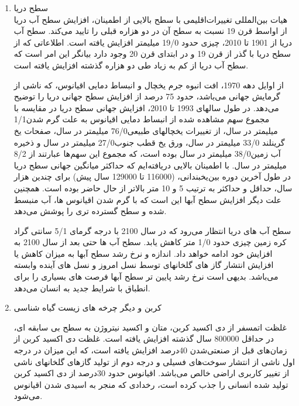 \begin{enumerate}
		
		
		
		
		
		
		\item  سطح دریا\\
		هیات بین‌المللی تغییرات‌اقلیمی با سطح بالایی از اطمینان، افزایش سطح آب دریا از اواسط قرن 19 نسبت به سطح آن در دو هزاره قبلی را تایید می‌کند. سطح آب دریا از 1901 تا 2010، چیزی حدود 19/0 میلیمتر افزایش یافته است. اطلاعاتی که از سطح دریا با گذر از قرن 19 و در ابتدای قرن 20 وجود دارد بیانگر این امر است که سطح آب دریا از کم به زیاد طی دو هزاره گذشته افزایش یافته است. 
		
		از اوایل دهه 1970، افت انبوه جرم یخچال و انبساط دمایی اقیانوس، که ناشی از گرمایش جهانی می‌باشد، حدود 75 درصد از افزایش سطح جهانی دریا را توضیح می‌دهد. در طول سالهای 1993 تا 2010، افزایش جهانی سطح دریا در مقایسه با مجموع سهم مشاهده شده از انبساط دمایی اقیانوس به علت گرم شدن1/1 میلیمتر در سال، از تغییرات یخچالهای طبیعی76/0 میلیمتر در سال، صفحات یخ گرینلند 33/0 میلیمتر در سال، ورق یخ قطب جنوب27/0 میلیمتر در سال و ذخیره آب زمین38/0 میلیمتر در سال بوده است، که مجموع این سهم‌ها عبارتند از 8/2 میلیمتر در سال. با اطمینان بالایی دریافته‌ایم که حداکثر میانگین جهانی سطح دریا در طول آخرین دوره بین‌یخبندانی، (116000 تا 129000 سال پیش) برای چندین هزار سال، حداقل و حداکثر به ترتیب 5 و 10 متر بالاتر از حال حاضر بوده است.
		همچنین علت دیگر افزایش سطح آبها این است که با گرم شدن اقیانوس ها، آب منبسط شده و سطح گسترده تری را پوشش می‌دهد.
		
		سطح آب های دریا انتظار می‌رود که در سال 2100 با درجه گرمای 5/1 سانتی گراد کره زمین چیزی حدود 1/0 متر کاهش یابد. سطح آب ها حتی بعد از سال 2100 به افزایش خود ادامه خواهد داد. اندازه و نرخ رشد سطح آبها به میزان کاهش یا افزایش انتشار گاز های گلخانهای توسط نسل امروز و نسل های آینده وابسته می‌باشد. بدیهی است نرخ رشد پایین تر سطح آبها فرصت های بسیاری را برای انطباق با شرایط جدید به انسان می‌دهد.
		
		
		
		
		
		
		
		
		
		
		\item کربن و دیگر چرخه های زیست گیاه شناسی
		
		غلظت اتمسفر از دی اکسید کربن، متان و اکسید نیتروژن به سطح بی سابقه ای، در حداقل 800000 سال گذشته افزایش یافته است. غلظت دی اکسید کربن از زمان‌های قبل از صنعتی‌شدن 40درصد  افزایش یافته است، که این میزان در درجه اول ناشی از انتشار سوخت‌های فسیلی و درجه دوم از تولید گازهای گلخانهای ناشی از تغییر کاربری اراضی خالص می‌باشد. اقیانوس حدود 30‌درصد از دی اکسید کربن تولید شده انسانی را جذب کرده است، رخدادی که منجر به اسیدی شدن اقیانوس می‌شود.
		

\end{enumerate}
